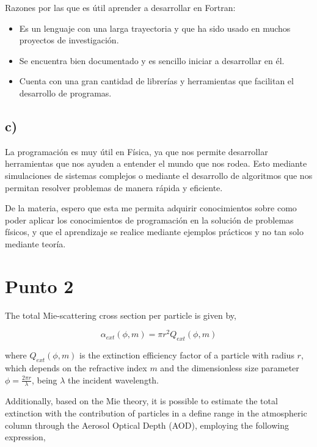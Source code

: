 \documentclass[10pt]{article}
\begin{document}
        Razones por las que es útil aprender a desarrollar en Fortran:
        \begin{itemize}
            \item Es un lenguaje con una larga trayectoria y que ha sido usado en muchos proyectos de investigación.
            \item Se encuentra bien documentado y es sencillo iniciar a desarrollar en él.
            \item Cuenta con una gran cantidad de librerías y herramientas que facilitan el desarrollo de programas.
        \end{itemize}

    
    \subsection*{c)}
        La programación es muy útil en Física, ya que nos permite desarrollar herramientas que nos ayuden a entender el mundo que nos rodea. Esto mediante simulaciones de sistemas complejos o mediante el desarrollo de algoritmos que nos permitan resolver problemas de manera rápida y eficiente.
    
        De la materia, espero que esta me permita adquirir conocimientos sobre como poder aplicar los conocimientos de programación en la solución de problemas físicos, y que el aprendizaje se realice mediante ejemplos prácticos y no tan solo mediante teoría.





    \section*{Punto 2}
    The total Mie-scattering cross section per particle is given by,

    \begin{equation}
        \alpha_{ext} \left( \phi, m \right) = \pi r^2Q_{ext}\left( \phi, m \right)
    \end{equation}

    where $ Q_{ext}(\phi, m) $ is the extinction efficiency factor of a particle with radius $ r $, which depends on the refractive index $ m $ and the dimensionless size parameter $ \phi = \frac{2 \pi r}{\lambda} $, being $ \lambda $ the incident wavelength.

    Additionally, based on the Mie theory, it is possible to estimate the total extinction with the contribution of particles in a define range in the atmospheric column through the Aerosol Optical Depth (AOD), employing the following expression,
\end{document}
